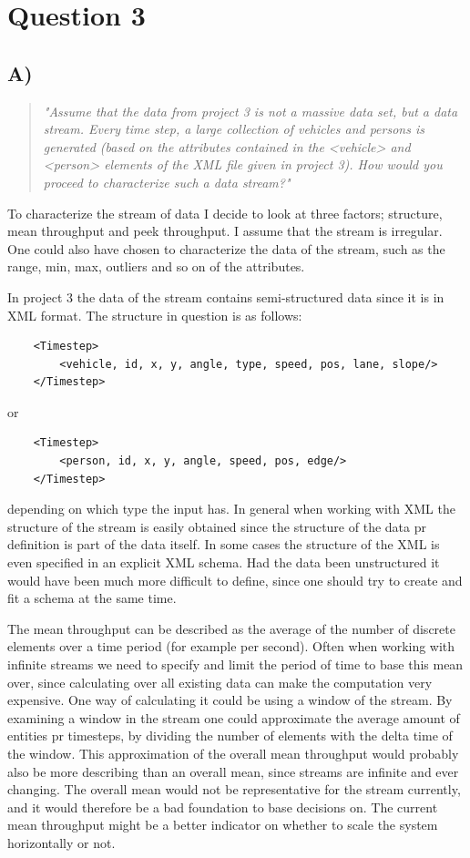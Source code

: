 	\section{Question 3}
	
	\subsection{A)}
	\begin{quote}
		\textit{"Assume	that	the	data	from	project	3	is	not	a	massive	data	set,	but	a	data	stream.	Every	time	step,	a	large	collection	of	vehicles	and	persons	is	generated	(based	on	the	attributes	contained	in	the	<vehicle>	and	<person>	elements	of	the	XML	file	given	in	project	3).	How	would	you	proceed	to	characterize	such	a	data	stream?"}
	\end{quote}
	To characterize the stream of data I decide to look at three factors; structure, mean throughput and peek throughput. I assume that the stream is irregular. One could also have chosen to characterize the data of the stream, such as the range, min, max, outliers and so on of the attributes.
	
	In project 3 the data of the stream contains semi-structured data since it is in XML format. The structure in question is as follows:
	\begin{verbatim}
	<Timestep>
	    <vehicle, id, x, y, angle, type, speed, pos, lane, slope/>
	</Timestep>
	\end{verbatim}
	or 
	\begin{verbatim}
	<Timestep>
	    <person, id, x, y, angle, speed, pos, edge/>
	</Timestep>
	\end{verbatim}
	depending on which type the input has. In general when working with XML the structure of the stream is easily obtained since the structure of the data pr definition is part of the data itself. In some cases the structure of the XML is even specified in an explicit XML schema. Had the data been unstructured it would have been much more difficult to define, since one should try to create and fit a schema at the same time.
	
	The mean throughput can be described as the average of the number of discrete elements over a time period (for example per second). Often when working with infinite streams we need to specify and limit the period of time to base this mean over, since calculating over all existing data can make the computation very expensive. One way of calculating it could be using a window of the stream. By examining a window in the stream one could approximate the average amount of entities pr timesteps, by dividing the number of elements with the delta time of the window. This approximation of the overall mean throughput would probably also be more describing than an overall mean, since streams are infinite and ever changing. The overall mean would not be representative for the stream currently, and it would therefore be a bad foundation to base decisions on. The current mean throughput might be a better indicator on whether to scale the system horizontally or not.
	
